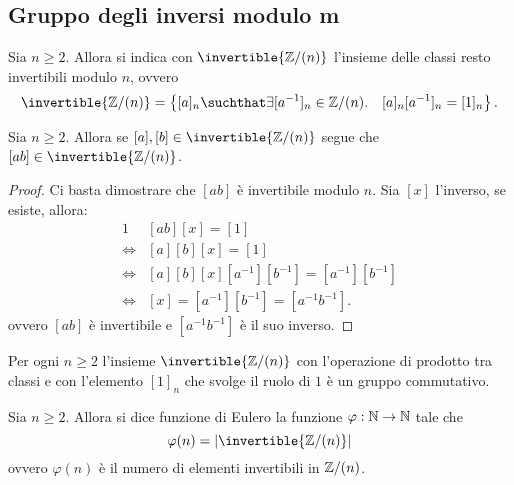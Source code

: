 \subsection{Gruppo degli inversi modulo m}

\begin{definition}
    Sia $n \geq 2$. Allora si indica con $\invertible{\Z/(n)}$ l'insieme delle classi resto invertibili modulo $n$, ovvero \begin{equation}
        \invertible{\Z/(n)} = \left\{[a]_n \suchthat \exists [a^{-1}]_n \in \Z/(n). \quad [a]_n[a^{-1}]_n = [1]_n\right\}.
    \end{equation} 
\end{definition}

\begin{proposition}\label{prodotto_invertibili_invertibile}
    Sia $n \geq 2$. Allora se $[a], [b] \in \invertible{\Z/(n)}$ segue che $[ab] \in \invertible{\Z/(n)}$.
\end{proposition}
\begin{proof}
    Ci basta dimostrare che $[ab]$ è invertibile modulo $n$. Sia $[x]$ l'inverso, se esiste, allora:
    \begin{alignat*}{1}
        &[ab][x] = [1] \\
        \iff &[a][b][x] = [1] \\
        \iff &[a][b][x][a^{-1}][b^{-1}] = [a^{-1}][b^{-1}] \\
        \iff &[x] = [a^{-1}][b^{-1}] = [a^{-1}b^{-1}].
    \end{alignat*}
    ovvero $[ab]$ è invertibile e $[a^{-1}b^{-1}]$ è il suo inverso.
\end{proof}

\begin{proposition}\label{Z(n)*_gruppo}
    Per ogni $n \geq 2$ l'insieme $\invertible{\Z/(n)}$ con l'operazione di prodotto tra classi e con l'elemento $[1]_n$ che svolge il ruolo di $1$ è un gruppo commutativo.
\end{proposition}

\begin{definition}
    Sia $n \geq 2$. Allora si dice funzione di Eulero la funzione $\varphi : \mathbb{N} \to \mathbb{N}$ tale che \begin{equation}
        \varphi(n) = \abs{\invertible{\Z/(n)}}
    \end{equation}
    ovvero $\varphi(n)$ è il numero di elementi invertibili in $\mathbb{Z}/(n)$.
\end{definition}


